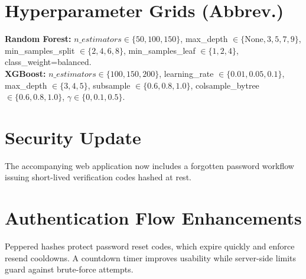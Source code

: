 \documentclass[conference]{IEEEtran}
\begin{document}
\section{Hyperparameter Grids (Abbrev.)}
\textbf{Random Forest:} \(n\_estimators \in \{50,100,150\}\), max\_depth \(\in \{\text{None},3,5,7,9\}\), min\_samples\_split \(\in \{2,4,6,8\}\), min\_samples\_leaf \(\in \{1,2,4\}\), class\_weight=balanced.\\
\textbf{XGBoost:} \(n\_estimators \in \{100,150,200\}\), learning\_rate \(\in \{0.01,0.05,0.1\}\), max\_depth \(\in \{3,4,5\}\), subsample \(\in \{0.6,0.8,1.0\}\), colsample\_bytree \(\in \{0.6,0.8,1.0\}\), \(\gamma \in \{0,0.1,0.5\}\).

\IEEEoverridecommandlockouts
{}
\section{Security Update}
The accompanying web application now includes a forgotten password workflow issuing short-lived verification codes hashed at rest.
\section{Authentication Flow Enhancements}
Peppered hashes protect password reset codes, which expire quickly and enforce resend cooldowns. A countdown timer improves usability while server-side limits guard against brute-force attempts.
\end{document}
